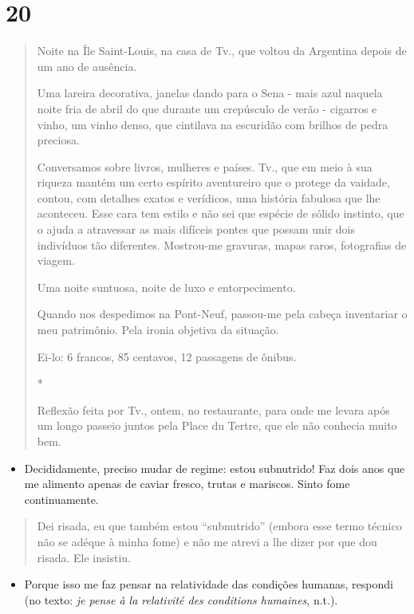 \section{20}\label{section-19}

\begin{quote}
Noite na Île Saint-Louis, na casa de Tv., que voltou da Argentina depois
de um ano de ausência.

Uma lareira decorativa, janelas dando para o Sena - mais azul naquela
noite fria de abril do que durante um crepúsculo de verão - cigarros e
vinho, um vinho denso, que cintilava na escuridão com brilhos de pedra
preciosa.

Conversamos sobre livros, mulheres e países. Tv., que em meio à sua
riqueza mantém um certo espírito aventureiro que o protege da vaidade,
contou, com detalhes exatos e verídicos, uma história fabulosa que lhe
aconteceu. Esse cara tem estilo e não sei que espécie de sólido
instinto, que o ajuda a atravessar as mais difíceis pontes que possam
unir dois indivíduos tão diferentes. Mostrou-me gravuras, mapas raros,
fotografias de viagem.

Uma noite suntuosa, noite de luxo e entorpecimento.

Quando nos despedimos na Pont-Neuf, passou-me pela cabeça inventariar o
meu patrimônio. Pela ironia objetiva da situação.

Ei-lo: 6 francos, 85 centavos, 12 passagens de ônibus.

*

Reflexão feita por Tv., ontem, no restaurante, para onde me levara após
um longo passeio juntos pela Place du Tertre, que ele não conhecia muito
bem.
\end{quote}

\begin{itemize}
\item
  Decididamente, preciso mudar de regime: estou subnutrido! Faz dois
  anos que me alimento apenas de caviar fresco, trutas e mariscos. Sinto
  fome continuamente.
\end{itemize}

\begin{quote}
Dei risada, eu que também estou ``subnutrido'' (embora esse termo
técnico não se adéque à minha fome) e não me atrevi a lhe dizer por que
dou risada. Ele insistiu.
\end{quote}

\begin{itemize}
\item
  Porque isso me faz pensar na relatividade das condições humanas,
  respondi (no texto: \emph{je pense à la relativité des conditions
  humaines}, n.t.).
\end{itemize}


